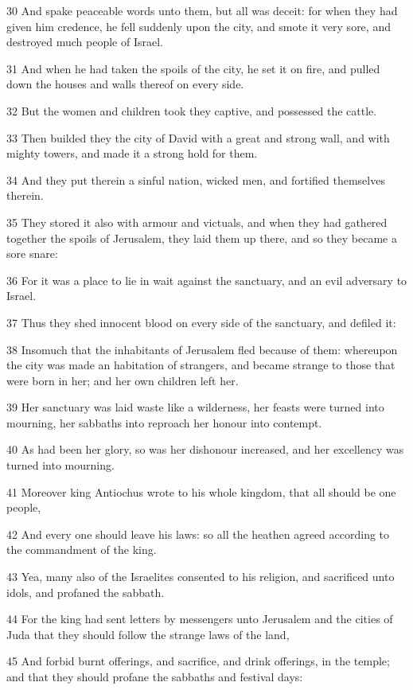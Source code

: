 \par 30 And spake peaceable words unto them, but all was deceit: for when they had given him credence, he fell suddenly upon the city, and smote it very sore, and destroyed much people of Israel.
\par 31 And when he had taken the spoils of the city, he set it on fire, and pulled down the houses and walls thereof on every side.
\par 32 But the women and children took they captive, and possessed the cattle.
\par 33 Then builded they the city of David with a great and strong wall, and with mighty towers, and made it a strong hold for them.
\par 34 And they put therein a sinful nation, wicked men, and fortified themselves therein.
\par 35 They stored it also with armour and victuals, and when they had gathered together the spoils of Jerusalem, they laid them up there, and so they became a sore snare:
\par 36 For it was a place to lie in wait against the sanctuary, and an evil adversary to Israel.
\par 37 Thus they shed innocent blood on every side of the sanctuary, and defiled it:
\par 38 Insomuch that the inhabitants of Jerusalem fled because of them: whereupon the city was made an habitation of strangers, and became strange to those that were born in her; and her own children left her.
\par 39 Her sanctuary was laid waste like a wilderness, her feasts were turned into mourning, her sabbaths into reproach her honour into contempt.
\par 40 As had been her glory, so was her dishonour increased, and her excellency was turned into mourning.
\par 41 Moreover king Antiochus wrote to his whole kingdom, that all should be one people,
\par 42 And every one should leave his laws: so all the heathen agreed according to the commandment of the king.
\par 43 Yea, many also of the Israelites consented to his religion, and sacrificed unto idols, and profaned the sabbath.
\par 44 For the king had sent letters by messengers unto Jerusalem and the cities of Juda that they should follow the strange laws of the land,
\par 45 And forbid burnt offerings, and sacrifice, and drink offerings, in the temple; and that they should profane the sabbaths and festival days:
